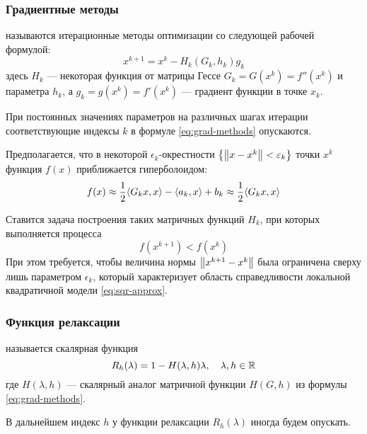 \subsubsection{Градиентные методы}

\begin{dfn}
   называются итерационные методы оптимизации со
  следующей рабочей формулой:
  \begin{equation}
    \label{eq:grad-methods}
    x^{k+1} = x^k - H_k\left(G_k, h_k\right) g_k
  \end{equation}
  здесь $H_k$ — некоторая функция от матрицы Гессе $G_k = G(x^k) =
  f''(x^k)$ и параметра $h_k$, а $g_k = g(x^k) = f'(x^k)$ — градиент
  функции в точке $x_k$.
\end{dfn}

При постоянных значениях параметров на различных шагах итерации
соответствующие индексы $k$ в формуле \eqref{eq:grad-methods}
опускаются.

Предполагается, что в некоторой $\epsilon_k$-окрестности $\left\{
  \left \lVert{x-x^k}\right \rVert < \varepsilon_k\right\}$ точки $x^k$ функция $f(x)$
приближается гиперболоидом:
\begin{equation}
  \label{eq:sqr-approx}
  f(x) \approx \frac{1}{2}{\left \langle G_k x, x \right \rangle} - {\left \langle a_k,x \right \rangle} + b_k \approx \frac{1}{2}{\left \langle G_k x, x \right \rangle}
\end{equation}

Ставится задача построения таких матричных функций $H_k$, при которых
выполняется  процесса
\begin{equation}
  \label{eq:relax-cond}
  f(x^{k+1}) < f(x^k)
\end{equation}
При этом требуется, чтобы величина нормы $\left \lVert{x^{k+1}-x^{k}}\right \rVert$ была
ограничена сверху лишь параметром $\epsilon_k$, который характеризует
область справедливости локальной квадратичной модели
\eqref{eq:sqr-approx}.

\subsubsection{Функция релаксации}

\begin{dfn}
   называется скалярная функция
  \begin{equation}
    \label{eq:relax-fun}
    R_h(\lambda) = 1 - H(\lambda, h)\lambda,\quad \lambda,h \in \mathbb{R}
  \end{equation}
  где $H(\lambda, h)$ — скалярный аналог матричной функции $H(G, h)$
  из формулы \eqref{eq:grad-methods}.
\end{dfn}
В дальнейшем индекс $h$ у функции релаксации $R_h(\lambda)$ иногда
будем опускать.

